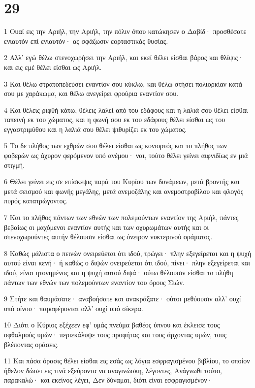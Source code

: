 \chapter{29}

\par 1 Ουαί εις την Αριήλ, την Αριήλ, την πόλιν όπου κατώκησεν ο Δαβίδ· προσθέσατε ενιαυτόν επί ενιαυτόν· ας σφάζωσιν εορταστικάς θυσίας.
\par 2 Αλλ' εγώ θέλω στενοχωρήσει την Αριήλ, και εκεί θέλει είσθαι βάρος και θλίψις· και εις εμέ θέλει είσθαι ως Αριήλ.
\par 3 Και θέλω στρατοπεδεύσει εναντίον σου κύκλω, και θέλω στήσει πολιορκίαν κατά σου με χαράκωμα, και θέλω ανεγείρει φρούρια εναντίον σου.
\par 4 Και θέλεις ριφθή κάτω, θέλεις λαλεί από του εδάφους και η λαλιά σου θέλει είσθαι ταπεινή εκ του χώματος, και η φωνή σου εκ του εδάφους θέλει είσθαι ως του εγγαστριμύθου και η λαλιά σου θέλει ψιθυρίζει εκ του χώματος.
\par 5 Το δε πλήθος των εχθρών σου θέλει είσθαι ως κονιορτός και το πλήθος των φοβερών ως άχυρον φερόμενον υπό ανέμου· ναι, τούτο θέλει γείνει αιφνιδίως εν μιά στιγμή.
\par 6 Θέλει γείνει εις σε επίσκεψις παρά του Κυρίου των δυνάμεων, μετά βροντής και μετά σεισμού και φωνής μεγάλης, μετά ανεμοζάλης και ανεμοστροβίλου και φλογός πυρός κατατρώγοντος.
\par 7 Και το πλήθος πάντων των εθνών των πολεμούντων εναντίον της Αριήλ, πάντες βεβαίως οι μαχόμενοι εναντίον αυτής και των οχυρωμάτων αυτής και οι στενοχωρούντες αυτήν θέλουσιν είσθαι ως όνειρον νυκτερινού οράματος.
\par 8 Καθώς μάλιστα ο πεινών ονειρεύεται ότι ιδού, τρώγει· πλην εξεγείρεται και η ψυχή αυτού είναι κενή· ή καθώς ο διψών ονειρεύεται ότι ιδού, πίνει· πλην εξεγείρεται και ιδού, είναι ητονημένος και η ψυχή αυτού διψά· ούτω θέλουσιν είσθαι τα πλήθη πάντων των εθνών των πολεμούντων εναντίον του όρους Σιών.
\par 9 Στήτε και θαυμάσατε· αναβοήσατε και ανακράξατε· ούτοι μεθύουσιν αλλ' ουχί υπό οίνου· παραφέρονται αλλ' ουχί υπό σίκερα.
\par 10 Διότι ο Κύριος εξέχεεν εφ' υμάς πνεύμα βαθέος ύπνου και έκλεισε τους οφθαλμούς υμών· περιεκάλυψε τους προφήτας και τους άρχοντας υμών, τους βλέποντας οράσεις.
\par 11 Και πάσα όρασις θέλει είσθαι εις εσάς ως λόγια εσφραγισμένου βιβλίου, το οποίον ήθελον δώσει εις τινά εξεύροντα να αναγινώσκη, λέγοντες, Ανάγνωθι τούτο, παρακαλώ· και εκείνος λέγει, Δεν δύναμαι, διότι είναι εσφραγισμένον·
